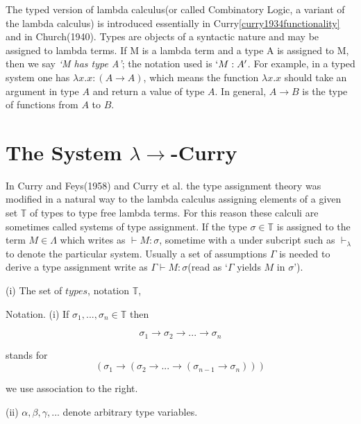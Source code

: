 The typed version of lambda calculus(or called Combinatory Logic, a variant of the lambda calculus) is introduced essentially in Curry\ref{curry1934functionality} and in Church(1940). Types are objects of a syntactic nature and may be assigned to lambda terms. If M is a lambda term and a type A is assigned to M, then we say \textit{`M has type A'}; the notation used is $`M:A'$. For example, in a typed system one has $\lambda x.x : (A \rightarrow A)$, which means the function $\lambda x.x$ should take an argument in type $A$ and return a value of type $A$. In general, $A \rightarrow B$ is the type of functions from $A$ to $B$.

\section{The System $\lambda \rightarrow $-Curry}

In Curry and Feys(1958) and Curry et al. the type assignment theory was modified in a natural way to the lambda calculus assigning elements of a given set $\mathbb{T}$ of types to type free lambda terms. For this reason these calculi are sometimes called systems of type assignment. If the type $\sigma \in \mathbb{T}$ is assigned to the term $M \in \Lambda$ which writes as $\vdash M : \sigma$, sometime with a under subcript such as $\vdash _\lambda$ to denote the particular system. Usually a set of assumptions $\Gamma$ is needed to derive a type assignment write as $\Gamma \vdash M : \sigma$(read as `$\Gamma$ yields $M$ in $\sigma$').

\begin{def1}
\normalfont (i) The set of $types$, notation $\mathbb{T}$, 
\end{def1} 

Notation. (i) If $\sigma _1,...,\sigma _n \in \mathbb{T}$ then

\begin{equation*}
\sigma _1 \rightarrow \sigma _2 \rightarrow ... \rightarrow \sigma _n
\end{equation*}

\noindent stands for
\begin{equation*}
(\sigma _1 \rightarrow (\sigma _2 \rightarrow ... \rightarrow (\sigma _{n-1} \rightarrow \sigma _n)))
\end{equation*}

\noindent we use association to the right.

     (ii) $\alpha,\beta,\gamma,...$ denote arbitrary type variables.


